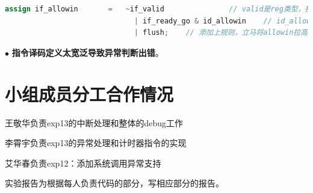 \documentclass[11pt]{article}
\begin{document}
\begin{lstlisting}[language=verilog]
  assign if_allowin       =   ~if_valid               // valid是reg类型，接受flush后最快下一个clk才能拉低
                              | if_ready_go & id_allowin    // id_allowin可能由于读后写阻塞，拉低
                              | flush;    // 添加上规则，立马将allowin拉高，在当前clk发送出pc
\end{lstlisting}

\noindent
$\bullet$
\textbf{指令译码定义太宽泛导致异常判断出错}。


         

      
\vspace{1ex}

\section{小组成员分工合作情况}
王敬华负责exp13的中断处理和整体的debug工作

李霄宇负责exp13的异常处理和计时器指令的实现

艾华春负责exp12：添加系统调用异常支持

实验报告为根据每人负责代码的部分，写相应部分的报告。
\end{document}
